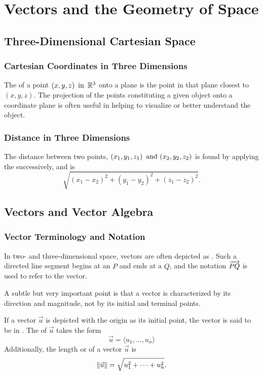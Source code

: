 \section{Vectors and the Geometry of Space}

\subsection{Three-Dimensional Cartesian Space}

\subsubsection*{Cartesian Coordinates in Three Dimensions}
The  of a point $(x,y,z) \operatorname{~\text{in}~} \mathbb{R}^3$ onto a plane is the point in that plane closest to $(x,y,z)$. The projection of the points constituting a given object onto a coordinate plane is often useful in helping to visualize or better understand the object.

\subsubsection*{Distance in Three Dimensions}
The distance between two points, $(x_1,y_1,z_1) \operatorname{~\text{and}~} (x_2,y_2,z_2)$ is found by applying the  successively, and is
\[
    \sqrt{(x_1-x_2)^2 + (y_1-y_2)^2 + (z_1-z_2)^2}.
\]

\subsection{Vectors and Vector Algebra}

\subsubsection*{Vector Terminology and Notation}
In two- and three-dimensional space, vectors are often depicted as . Such a directed line segment begins at an  $P$ and ends at a  $Q$, and the notation $\overrightarrow{PQ}$ is used to refer to the vector.

A subtle but very important point is that a vector is characterized  by its direction and magnitude, not by its initial and terminal points.

If a vector $\vec{u}$ is depicted with the origin as its initial point, the vector is said to be in . The  of $\vec{u}$ takes the form
\[
    \vec{u} = \langle u_1, \ldots, u_n \rangle
\]
Additionally, the length or  of a vector $\vec{u}$ is
\[
    \lVert \vec{u} \rVert = \sqrt{u_1^2 + \cdots + u_n^2}.
\]

